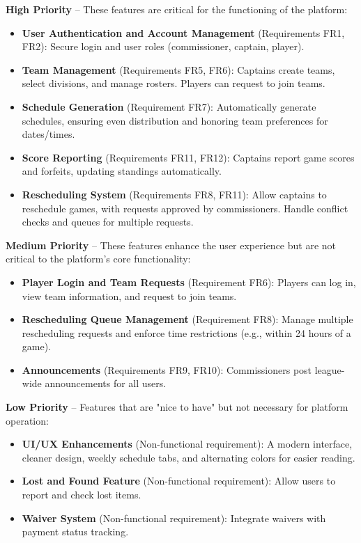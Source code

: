 \documentclass[12pt, titlepage]{article}
\begin{document}
\textbf{High Priority} – These features are critical for the functioning of the platform:
\begin{itemize}
    \item \textbf{User Authentication and Account Management} (Requirements FR1, FR2): Secure login and user roles (commissioner, captain, player).
    \item \textbf{Team Management} (Requirements FR5, FR6): Captains create teams, select divisions, and manage rosters. Players can request to join teams.
    \item \textbf{Schedule Generation} (Requirement FR7): Automatically generate schedules, ensuring even distribution and honoring team preferences for dates/times.
    \item \textbf{Score Reporting} (Requirements FR11, FR12): Captains report game scores and forfeits, updating standings automatically.
    \item \textbf{Rescheduling System} (Requirements FR8, FR11): Allow captains to reschedule games, with requests approved by commissioners. Handle conflict checks and queues for multiple requests.
\end{itemize}

\textbf{Medium Priority} – These features enhance the user experience but are not critical to the platform's core functionality:
\begin{itemize}
    \item \textbf{Player Login and Team Requests} (Requirement FR6): Players can log in, view team information, and request to join teams.
    \item \textbf{Rescheduling Queue Management} (Requirement FR8): Manage multiple rescheduling requests and enforce time restrictions (e.g., within 24 hours of a game).
    \item \textbf{Announcements} (Requirements FR9, FR10): Commissioners post league-wide announcements for all users.
\end{itemize}

\textbf{Low Priority} – Features that are "nice to have" but not necessary for platform operation:
\begin{itemize}
    \item \textbf{UI/UX Enhancements} (Non-functional requirement): A modern interface, cleaner design, weekly schedule tabs, and alternating colors for easier reading.
    \item \textbf{Lost and Found Feature} (Non-functional requirement): Allow users to report and check lost items.
    \item \textbf{Waiver System} (Non-functional requirement): Integrate waivers with payment status tracking.
\end{itemize}
\end{document}
